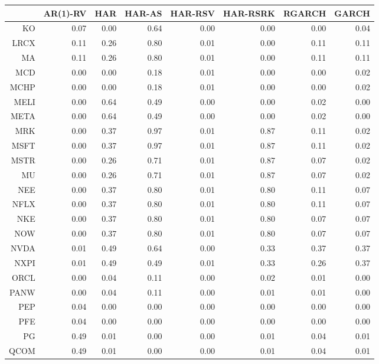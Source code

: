 \begin{table}[ht]
\centering
\begin{tabular}{rrrrrrrr}
  \hline
 & AR(1)-RV & HAR & HAR-AS & HAR-RSV & HAR-RSRK & RGARCH & GARCH \\ 
  \hline
KO & 0.07 & 0.00 & 0.64 & 0.00 & 0.00 & 0.00 & 0.04 \\ 
  LRCX & 0.11 & 0.26 & 0.80 & 0.01 & 0.00 & 0.11 & 0.11 \\ 
  MA & 0.11 & 0.26 & 0.80 & 0.01 & 0.00 & 0.11 & 0.11 \\ 
  MCD & 0.00 & 0.00 & 0.18 & 0.01 & 0.00 & 0.00 & 0.02 \\ 
  MCHP & 0.00 & 0.00 & 0.18 & 0.01 & 0.00 & 0.00 & 0.02 \\ 
  MELI & 0.00 & 0.64 & 0.49 & 0.00 & 0.00 & 0.02 & 0.00 \\ 
  META & 0.00 & 0.64 & 0.49 & 0.00 & 0.00 & 0.02 & 0.00 \\ 
  MRK & 0.00 & 0.37 & 0.97 & 0.01 & 0.87 & 0.11 & 0.02 \\ 
  MSFT & 0.00 & 0.37 & 0.97 & 0.01 & 0.87 & 0.11 & 0.02 \\ 
  MSTR & 0.00 & 0.26 & 0.71 & 0.01 & 0.87 & 0.07 & 0.02 \\ 
  MU & 0.00 & 0.26 & 0.71 & 0.01 & 0.87 & 0.07 & 0.02 \\ 
  NEE & 0.00 & 0.37 & 0.80 & 0.01 & 0.80 & 0.11 & 0.07 \\ 
  NFLX & 0.00 & 0.37 & 0.80 & 0.01 & 0.80 & 0.11 & 0.07 \\ 
  NKE & 0.00 & 0.37 & 0.80 & 0.01 & 0.80 & 0.07 & 0.07 \\ 
  NOW & 0.00 & 0.37 & 0.80 & 0.01 & 0.80 & 0.07 & 0.07 \\ 
  NVDA & 0.01 & 0.49 & 0.64 & 0.00 & 0.33 & 0.37 & 0.37 \\ 
  NXPI & 0.01 & 0.49 & 0.49 & 0.01 & 0.33 & 0.26 & 0.37 \\ 
  ORCL & 0.00 & 0.04 & 0.11 & 0.00 & 0.02 & 0.01 & 0.00 \\ 
  PANW & 0.00 & 0.04 & 0.11 & 0.00 & 0.01 & 0.01 & 0.00 \\ 
  PEP & 0.04 & 0.00 & 0.00 & 0.00 & 0.00 & 0.00 & 0.00 \\ 
  PFE & 0.04 & 0.00 & 0.00 & 0.00 & 0.00 & 0.00 & 0.00 \\ 
  PG & 0.49 & 0.01 & 0.00 & 0.00 & 0.01 & 0.04 & 0.01 \\ 
  QCOM & 0.49 & 0.01 & 0.00 & 0.00 & 0.01 & 0.04 & 0.01 \\ 

\end{tabular}
\end{table}
